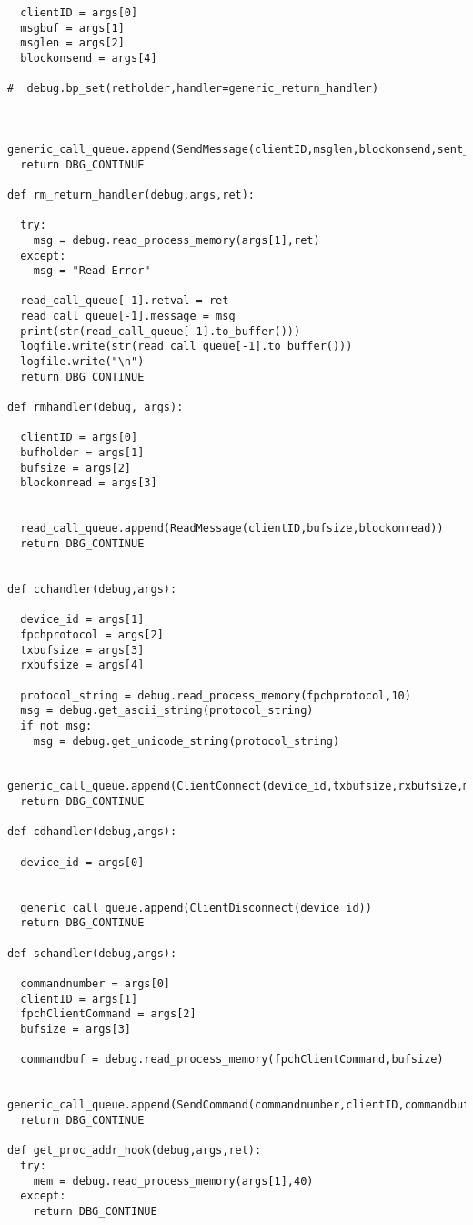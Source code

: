 \begin{appendices}
\begin{verbatim}
  clientID = args[0]
  msgbuf = args[1]
  msglen = args[2]
  blockonsend = args[4]

#  debug.bp_set(retholder,handler=generic_return_handler)


  generic_call_queue.append(SendMessage(clientID,msglen,blockonsend,sent_message))
  return DBG_CONTINUE

def rm_return_handler(debug,args,ret):

  try:
    msg = debug.read_process_memory(args[1],ret)
  except:
    msg = "Read Error"

  read_call_queue[-1].retval = ret
  read_call_queue[-1].message = msg
  print(str(read_call_queue[-1].to_buffer()))
  logfile.write(str(read_call_queue[-1].to_buffer()))
  logfile.write("\n")
  return DBG_CONTINUE

def rmhandler(debug, args):

  clientID = args[0]
  bufholder = args[1]
  bufsize = args[2]
  blockonread = args[3]


  read_call_queue.append(ReadMessage(clientID,bufsize,blockonread))
  return DBG_CONTINUE


def cchandler(debug,args):

  device_id = args[1]
  fpchprotocol = args[2]
  txbufsize = args[3]
  rxbufsize = args[4]

  protocol_string = debug.read_process_memory(fpchprotocol,10)
  msg = debug.get_ascii_string(protocol_string)
  if not msg:
    msg = debug.get_unicode_string(protocol_string)

  generic_call_queue.append(ClientConnect(device_id,txbufsize,rxbufsize,msg))
  return DBG_CONTINUE

def cdhandler(debug,args):

  device_id = args[0]


  generic_call_queue.append(ClientDisconnect(device_id))
  return DBG_CONTINUE

def schandler(debug,args):

  commandnumber = args[0]
  clientID = args[1]
  fpchClientCommand = args[2]
  bufsize = args[3]

  commandbuf = debug.read_process_memory(fpchClientCommand,bufsize)

  generic_call_queue.append(SendCommand(commandnumber,clientID,commandbuf,bufsize))
  return DBG_CONTINUE

def get_proc_addr_hook(debug,args,ret):
  try:
    mem = debug.read_process_memory(args[1],40)
  except:
    return DBG_CONTINUE


\end{verbatim}
\end{appendices}
